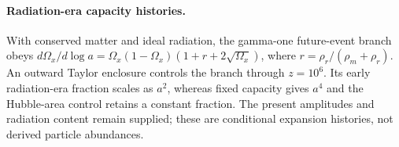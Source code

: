 \paragraph{Radiation-era capacity histories.}
With conserved matter and ideal radiation, the gamma-one future-event
branch obeys
$d\Omega_x/d\log a=\Omega_x(1-\Omega_x)(1+r+2\sqrt{\Omega_x})$,
where $r=\rho_r/(\rho_m+\rho_r)$.
An outward Taylor enclosure controls the branch through $z=10^6$.
Its early radiation-era fraction scales as $a^2$, whereas fixed capacity
gives $a^4$ and the Hubble-area control retains a constant fraction.
The present amplitudes and radiation content remain supplied; these are
conditional expansion histories, not derived particle abundances.
